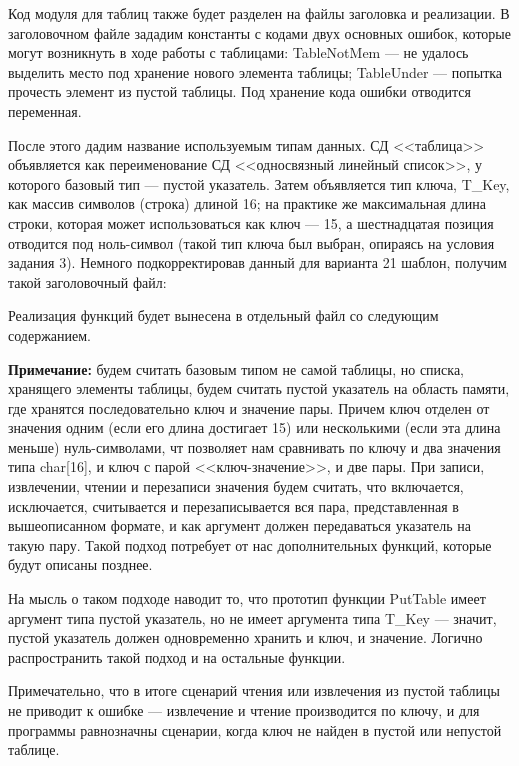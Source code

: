 \documentclass[12pt]{article}
\begin{document}
{	Код модуля для таблиц также будет разделен на файлы заголовка и реализации. В заголовочном файле зададим константы с кодами двух основных ошибок, которые могут возникнуть в ходе работы с таблицами: TableNotMem --- не удалось выделить место под хранение нового элемента таблицы; TableUnder --- попытка прочесть элемент из пустой таблицы. Под хранение кода ошибки отводится переменная. 
	
	После этого дадим название используемым типам данных. СД <<таблица>> объявляется как переименование СД <<односвязный линейный список>>, у которого базовый тип --- пустой указатель. Затем объявляется тип ключа, T\_Key, как массив символов (строка) длиной 16; на практике же максимальная длина строки, которая может использоваться как ключ --- 15, а шестнадцатая позиция отводится под ноль-символ (такой тип ключа был выбран, опираясь на условия задания 3). Немного подкорректировав данный для варианта 21 шаблон, получим такой заголовочный файл:
	
	 
		
	Реализация функций будет вынесена в отдельный файл со следующим содержанием.
	
	{\bf Примечание: } будем считать базовым типом не самой таблицы, но списка, хранящего элементы таблицы, будем считать пустой указатель на область памяти, где хранятся последовательно ключ и значение пары. Причем ключ отделен от значения одним (если его длина достигает 15) или несколькими (если эта длина меньше) нуль-символами, чт позволяет нам сравнивать по ключу и два значения типа char[16], и ключ с парой <<ключ-значение>>, и две пары. При записи, извлечении, чтении и перезаписи значения будем считать, что включается, исключается, считывается и перезаписывается вся пара, представленная в вышеописанном формате, и как аргумент должен передаваться указатель на такую пару. Такой подход потребует от нас дополнительных функций, которые будут описаны позднее.
	
	На мысль о таком подходе наводит то, что прототип функции PutTable имеет аргумент типа пустой указатель, но не имеет аргумента типа T\_Key --- значит, пустой указатель должен одновременно хранить и ключ, и значение. Логично распространить такой подход и на остальные функции.
	
	 
	
	Примечательно, что в итоге сценарий чтения или извлечения из пустой таблицы не приводит к ошибке --- извлечение и чтение производится по ключу, и для программы равнозначны сценарии, когда ключ не найден в пустой или непустой таблице.

}
\end{document}
